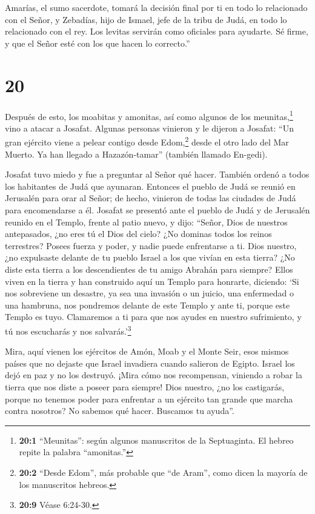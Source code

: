  Amarías, el sumo sacerdote, tomará la decisión final por
ti en todo lo relacionado con el Señor, y Zebadías, hijo de Ismael, jefe
de la tribu de Judá, en todo lo relacionado con el rey. Los levitas
servirán como oficiales para ayudarte. Sé firme, y que el Señor esté con
los que hacen lo correcto.''

\hypertarget{section-19}{%
\section{20}\label{section-19}}

 Después de esto, los moabitas y amonitas, así como algunos
de los meunitas,\footnote{\textbf{20:1} ``Meunitas'': según algunos
  manuscritos de la Septuaginta. El hebreo repite la palabra
  ``amonitas.''} vino a atacar a Josafat.  Algunas personas
vinieron y le dijeron a Josafat: ``Un gran ejército viene a pelear
contigo desde Edom,\footnote{\textbf{20:2} ``Desde Edom'', más probable
  que ``de Aram'', como dicen la mayoría de los manuscritos hebreos.}
desde el otro lado del Mar Muerto. Ya han llegado a Hazazón-tamar''
(también llamado En-gedi).

 Josafat tuvo miedo y fue a preguntar al Señor qué hacer.
También ordenó a todos los habitantes de Judá que ayunaran. 
Entonces el pueblo de Judá se reunió en Jerusalén para orar al Señor; de
hecho, vinieron de todas las ciudades de Judá para encomendarse a él.
 Josafat se presentó ante el pueblo de Judá y de Jerusalén
reunido en el Templo, frente al patio nuevo,  y dijo:
``Señor, Dios de nuestros antepasados, ¿no eres tú el Dios del cielo?
¿No dominas todos los reinos terrestres? Posees fuerza y poder, y nadie
puede enfrentarse a ti.  Dios nuestro, ¿no expulsaste
delante de tu pueblo Israel a los que vivían en esta tierra? ¿No diste
esta tierra a los descendientes de tu amigo Abrahán para siempre?
 Ellos viven en la tierra y han construido aquí un Templo
para honrarte, diciendo:  `Si nos sobreviene un desastre, ya
sea una invasión o un juicio, una enfermedad o una hambruna, nos
pondremos delante de este Templo y ante ti, porque este Templo es tuyo.
Clamaremos a ti para que nos ayudes en nuestro sufrimiento, y tú nos
escucharás y nos salvarás.'\footnote{\textbf{20:9} Véase 6:24-30.}

 Mira, aquí vienen los ejércitos de Amón, Moab y el Monte
Seir, esos mismos países que no dejaste que Israel invadiera cuando
salieron de Egipto. Israel los dejó en paz y no los destruyó.
 ¡Mira cómo nos recompensan, viniendo a robar la tierra que
nos diste a poseer para siempre!  Dios nuestro, ¿no los
castigarás, porque no tenemos poder para enfrentar a un ejército tan
grande que marcha contra nosotros? No sabemos qué hacer. Buscamos tu
ayuda''.

